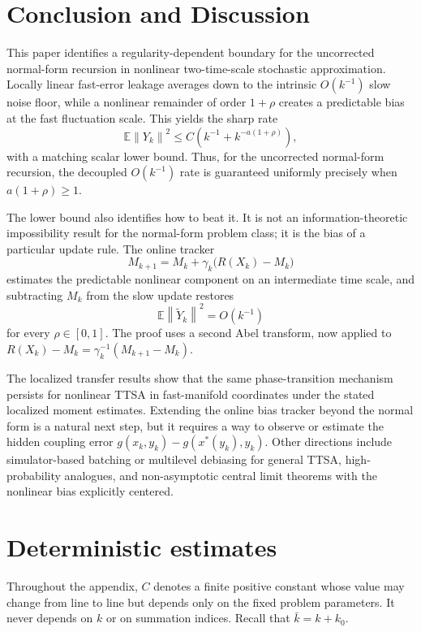 \documentclass{article}
\newcommand{\E}{\mathbb{E}}
\newcommand{\norm}[1]{\left\lVert #1\right\rVert}
\begin{document}
\section{Conclusion and Discussion}

This paper identifies a regularity-dependent boundary for the uncorrected normal-form recursion in nonlinear two-time-scale stochastic approximation. Locally linear fast-error leakage averages down to the intrinsic $O(k^{-1})$ slow noise floor, while a nonlinear remainder of order $1+\rho$ creates a predictable bias at the fast fluctuation scale. This yields the sharp rate
\[
  \E\norm{Y_k}^2
  \le
  C\left(k^{-1}+k^{-a(1+\rho)}\right),
\]
with a matching scalar lower bound. Thus, for the uncorrected normal-form recursion, the decoupled $O(k^{-1})$ rate is guaranteed uniformly precisely when $a(1+\rho)\ge1$.

The lower bound also identifies how to beat it. It is not an information-theoretic impossibility result for the normal-form problem class; it is the bias of a particular update rule. The online tracker
\[
  M_{k+1}=M_k+\gamma_k\big(R(X_k)-M_k\big)
\]
estimates the predictable nonlinear component on an intermediate time scale, and subtracting $M_k$ from the slow update restores
\[
  \E\norm{\widetilde Y_k}^2=O(k^{-1})
\]
for every $\rho\in[0,1]$. The proof uses a second Abel transform, now applied to $R(X_k)-M_k=\gamma_k^{-1}(M_{k+1}-M_k)$.

The localized transfer results show that the same phase-transition mechanism persists for nonlinear TTSA in fast-manifold coordinates under the stated localized moment estimates. Extending the online bias tracker beyond the normal form is a natural next step, but it requires a way to observe or estimate the hidden coupling error $g(x_k,y_k)-g(x^*(y_k),y_k)$. Other directions include simulator-based batching or multilevel debiasing for general TTSA, high-probability analogues, and non-asymptotic central limit theorems with the nonlinear bias explicitly centered.
\newpage


\newpage
\appendix

\section{Deterministic estimates}\label{app:deterministic}

Throughout the appendix, $C$ denotes a finite positive constant whose value may change from line to line but depends only on the fixed problem parameters. It never depends on $k$ or on summation indices. Recall that $\bar k=k+k_0$.
\end{document}
